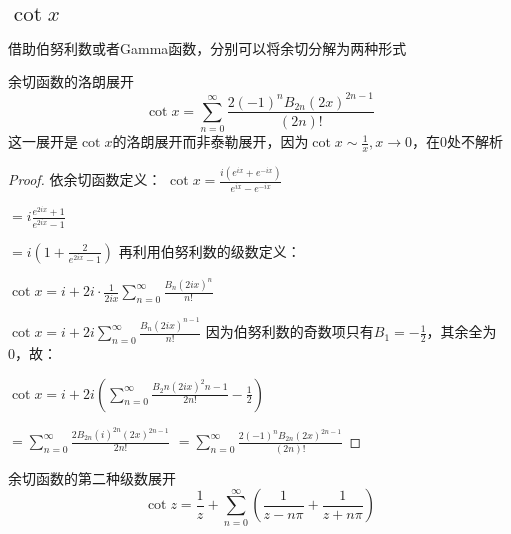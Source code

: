 \documentclass[12pt, a4paper, oneside, UTF8]{ctexbook}
\begin{document}
		\subsection{$\cot x$}
			借助伯努利数或者Gamma函数，分别可以将余切分解为两种形式
			\begin{them}{余切函数的洛朗展开}{}
				\begin{equation}
					\cot x = \sum\limits_{n=0}^{\infty}\frac{2(-1)^n B_{2n} (2x)^{2n-1}}{(2n)!}
				\end{equation}
				这一展开是$\cot x$的洛朗展开而非泰勒展开，因为$\cot x \sim \frac{1}{x},x\to 0$，在0处不解析
			\end{them}
			\begin{proof}
				依余切函数定义：
				$\cot x = \frac{i(e^{ix}+e^{-ix})}{e^{ix}-e^{-ix}}$
				
				$=i\frac{e^{2ix}+1}{e^{2ix}-1}$
				
				$=i\left(1+\frac{2}{e^{2ix}-1}\right)$
				再利用伯努利数的级数定义：
				
				$\cot x = i+2i\cdot \frac{1}{2ix} \sum\limits_{n=0}^{\infty} \frac{B_n (2ix)^n}{n!}$
				
				$\cot x = i+2i\sum\limits_{n=0}^{\infty} \frac{B_n (2ix)^{n-1}}{n!}$
				因为伯努利数的奇数项只有$B_1=-\frac{1}{2}$，其余全为0，故：
				
				$\cot x = i+2i\left(\sum_{n=0}^{\infty} \frac{B_2n (2ix)^2n-1}{2n!} -\frac{1}{2}\right)$
				
				$=\sum\limits_{n=0}^{\infty} \frac{2 B_{2n} (i)^{2n} (2x)^{2n-1}}{2n!}$
				$=\sum\limits_{n=0}^{\infty}\frac{2(-1)^n B_{2n} (2x)^{2n-1}}{(2n)!}$
			\end{proof}
			\begin{them}{余切函数的第二种级数展开}{}
				\begin{equation}
					\cot z = \frac{1}{z}+\sum\limits_{n=0}^{\infty} \left(\frac{1}{z-n\pi}+\frac{1}{z+n\pi}\right)
				\end{equation}
			\end{them}
\end{document}
